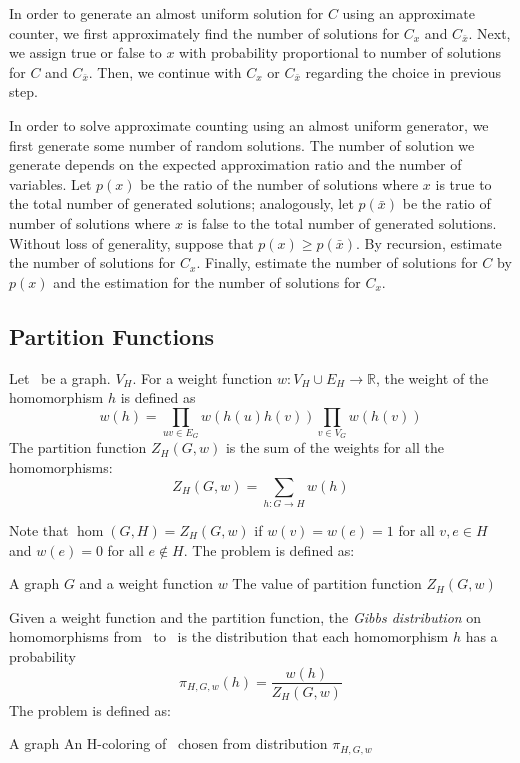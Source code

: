 In order to generate an almost uniform solution for \(C\) using an approximate counter,
we first approximately find the number of solutions for \(C_x\) and \(C_{\bar x}\)\@.
Next, we assign true or false to \(x\) with probability proportional to number of solutions 
for \(C\) and \(C_{\bar x}\)\@. Then, we continue
with \(C_x\) or \(C_{\bar x}\) regarding the choice in previous step.

In order to solve approximate counting using an almost uniform generator, we first
generate some number of random solutions. The number of solution we generate depends 
on the expected approximation ratio and the number of variables.
Let \(p(x)\) be the ratio of the number of solutions
where \(x\) is true to the total number of generated solutions; analogously, let \(p(\bar x)\) be
the ratio of number of solutions where \(x\) is false to the total number of generated solutions.
Without loss of generality, suppose that \(p(x) \ge p(\bar x)\)\@.
By recursion, estimate the number of solutions for \(C_x\). Finally, estimate 
the number of solutions for \(C\) by \(p(x)\) and the estimation for the 
number of solutions for \(C_x\)\@.

\subsection*{Partition Functions}
Let \mH\ be a graph.%
\(V_H\). For a weight function \(w: V_H \cup E_H\to \mathbb{R}\), the weight of the homomorphism 
\(h\) is defined as
\[w(h)=\prod_{uv\in E_G}w(h(u)h(v))\prod_{v\in V_G}w(h(v))\]
The partition function \(Z_H(G,w)\) is the sum of the weights for all the homomorphisms:
\[Z_H(G,w)=\sum_{h:G\to H}w(h)\]

Note that \(\hom(G,H)=Z_{H}(G,w)\) if \(w(v)=w(e)=1\) for all \(v,e\in H\)
and \(w(e)=0\) for all \(e\not\in H\)\@. 
The problem  is defined as:

\pnndef%
{A graph \(G\) and a weight function \(w\)}
{The value of partition function \(Z_H(G,w)\)}


Given a weight function and the partition function, 
the \emph{Gibbs distribution} on homomorphisms from \mG\ to \mH\ is
the distribution that each homomorphism \(h\) has a probability 
\[\pi_{H,G,w}(h)=\frac{w(h)}{Z_H(G,w)}\]
The problem  is defined as:

\pnndef%
{A graph \mG}
{An H-coloring of \mG\ chosen from distribution \(\pi_{H,G,w}\)}

